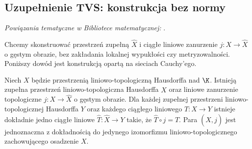 \subsection{Uzupełnienie TVS: konstrukcja bez normy}

\noindent\emph{Powiązania tematyczne w Bibliotece matematycznej:} .


Chcemy skonstruować przestrzeń zupełną $\widehat X$
i ciągłe liniowe zanurzenie $j:X\to\widehat X$ o gęstym obrazie,
bez zakładania lokalnej wypukłości czy metryzowalności.
Poniższy dowód jest konstrukcją opartą na sieciach Cauchy'ego.

\begin{twierdzenie}
\label{thm:tvs-completion}
Niech $X$ będzie przestrzenią liniowo-topologiczną Hausdorffa
nad $\K$. Istnieją zupełna przestrzeń liniowo-topologiczna
Hausdorffa $\widehat X$ oraz liniowe zanurzenie topologiczne
$j:X\to\widehat X$ o gęstym obrazie. Dla każdej zupełnej
przestrzeni liniowo-topologicznej Hausdorffa $Y$ oraz każdego
ciągłego liniowego $T:X\to Y$ istnieje dokładnie jedno
ciągłe liniowe $\widehat T:\widehat X\to Y$ takie,
że $\widehat T\circ j=T$. Para $(\widehat X,j)$ jest
jednoznaczna z dokładnością do jedynego izomorfizmu
liniowo-topologicznego zachowującego osadzenie $X$.
\end{twierdzenie}

